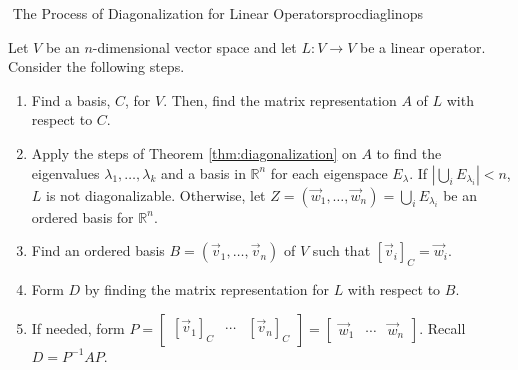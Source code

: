         \begin{theorem}{\Stop\,\,The Process of Diagonalization for Linear Operators}{procdiaglinops}

            Let \(V\) be an \(n\)-dimensional vector space and let \(L:V\to V\) be a linear operator. Consider the following steps.
            \begin{enumerate}
                \item Find a basis, \(C\), for \(V\). Then, find the matrix representation \(A\) of \(L\) with respect to \(C\).
                \item Apply the steps of Theorem \ref{thm:diagonalization} on \(A\) to find the eigenvalues \(\lambda_1,\ldots,\lambda_k\) and a basis in \(\mathbb{R}^n\) for each eigenspace \(E_\lambda\). If \(\left|\bigcup_{i}E_{\lambda_i}\right|<n\), \(L\) is not diagonalizable. Otherwise, let \(Z=(\vec{w}_1,\ldots,\vec{w}_n)=\bigcup_i E_{\lambda_i}\) be an ordered basis for \(\mathbb{R}^n\).
                \item Find an ordered basis \(B=(\vec{v}_1,\ldots,\vec{v}_n)\) of \(V\) such that \([\vec{v}_i]_C=\vec{w}_i\).
                \item Form \(D\) by finding the matrix representation for \(L\) with respect to \(B\).
                \item If needed, form \(P=\begin{bmatrix} [\vec{v}_1]_C & \cdots & [\vec{v}_n]_C \end{bmatrix}=\begin{bmatrix} \vec{w}_1 & \cdots & \vec{w}_n \end{bmatrix}\). Recall \(D=P^{-1}AP\).
            \end{enumerate}

        \end{theorem}